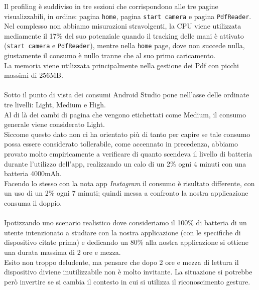 \noindent Il profiling è suddiviso in tre sezioni che corrispondono alle tre pagine visualizzabili, in ordine: pagina \texttt{home}, pagina \texttt{start camera} e pagina \texttt{PdfReader}.\\
Nel complesso non abbiamo misurazioni stravolgenti, la CPU viene utilizzata mediamente il 17\% del suo potenziale quando il tracking delle mani è attivato (\texttt{start camera} e \texttt{PdfReader}), mentre nella \texttt{home} page, dove non succede nulla, giustamente il consumo è nullo tranne che al suo primo caricamento.\\
La memoria viene utilizzata principalmente nella gestione dei Pdf con picchi massimi di 256MB.\\
\\
\noindent Sotto il punto di vista dei consumi Android Studio pone nell'asse delle ordinate tre livelli: Light, Medium e High.\\
Al di là dei cambi di pagina che vengono etichettati come Medium, il consumo generale viene considerato Light.\\
Siccome questo dato non ci ha orientato più di tanto per capire se tale consumo possa essere considerato tollerabile, come accennato in precedenza, abbiamo provato molto empiricamente a verificare di quanto scendeva il livello di batteria durante l'utilizzo dell'app, realizzando un calo di un 2\% ogni 4 minuti con una batteria 4000mAh.\\
Facendo lo stesso con la nota app \textit{Instagram} il consumo è risultato differente, con un uso di un 2\% ogni 7 minuti; quindi messa a confronto la nostra applicazione consuma il doppio.\\
\\
\noindent Ipotizzando uno scenario realistico dove consideriamo il 100\% di batteria di un utente intenzionato a studiare con la nostra applicazione (con le specifiche di dispositivo citate prima) e dedicando un 80\% alla nostra applicazione si ottiene una durata massima di 2 ore e mezza.\\
Esito non troppo deludente, ma pensare che dopo 2 ore e mezza di lettura il dispositivo diviene inutilizzabile non è molto invitante. La situazione si potrebbe però invertire se si cambia il contesto in cui si utilizza il riconoscimento gesture.



